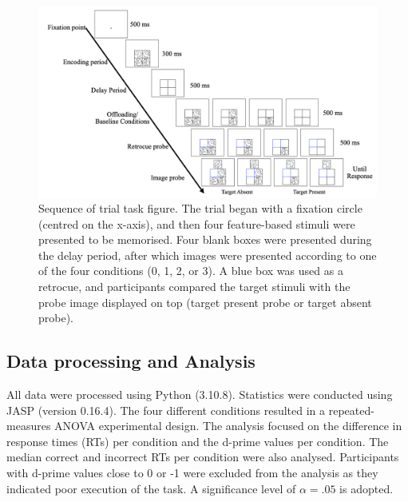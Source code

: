 \documentclass[
    a4paper,
    man,
    floatsintext,
    british
]{apa6}
\begin{document}
\begin{figure}[hbt!]
    \centering
    \includegraphics[scale = 0.24]{task figure.jpeg}
    \caption{Sequence of trial task figure. The trial began with a fixation circle (centred on the x-axis), and then four feature-based stimuli were presented to be memorised. Four blank boxes were presented during the delay period, after which images were presented according to one of the four conditions (0, 1, 2, or 3). A blue box was used as a retrocue, and participants compared the target stimuli with the probe image displayed on top (target present probe or target absent probe).}
    \label{fig:task_fig}
\end{figure}

\newpage
\subsection{Data processing and Analysis}
All data were processed using Python (3.10.8). Statistics were conducted using JASP (version 0.16.4). The four different conditions resulted in a repeated-measures ANOVA experimental design. The analysis focused on the difference in response times (RTs) per condition and the d-prime values per condition. The median correct and incorrect RTs per condition were also analysed. Participants with d-prime values close to 0 or -1 were excluded from the analysis as they indicated poor execution of the task. A significance level of $\alpha = .05$ is adopted. 

\newpage
\end{document}
